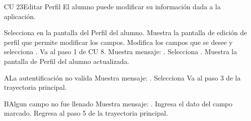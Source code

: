 \begin{UseCase} {CU 23}{Editar Perfil}{
	El alumno puede modificar su información dada a la aplicación.
}





\end{UseCase}


\begin{UCtrayectoria}
	
	\UCpaso [\UCactor]	Selecciona  en la pantalla del Perfil del alumno. 
	\UCpaso [\UCsist]Muestra la pantalla de edición de perfil que permite modificar los campos.
	\UCpaso [\UCactor]Modifica los campos que se desee y selecciona .
	\UCpaso Va al paso 1 de CU 8.
	\UCpaso [\UCsist]Muestra mensaje: .
	\UCpaso [\UCactor]Selecciona .
	\UCpaso [\UCsist]Muestra la pantalla de Perfil del alumno actualizada.
\end{UCtrayectoria}



\begin{UCtrayectoriaA}{A}{La autentificación no valida}
	\UCpaso [\UCsist]Muestra mensaje: .
	\UCpaso [\UCactor]	Selecciona 
	\UCpaso Va al paso 3 de la trayectoria principal.
\end{UCtrayectoriaA}

\begin{UCtrayectoriaA}{B}{Algun campo no fue llenado}
	\UCpaso [\UCsist]Muestra mensaje: .
	\UCpaso [\UCactor]	Ingresa el dato del campo marcado.
	\UCpaso Regresa al paso 5 de la trayectoria principal.
\end{UCtrayectoriaA}

